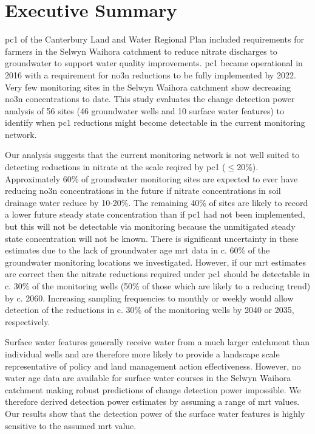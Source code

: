
\section*{Executive Summary} \label{exsum} %


\gls{pc1} of the Canterbury Land and Water Regional Plan included requirements for farmers in the Selwyn Waihora catchment to reduce nitrate discharges to groundwater to support water quality improvements.
\gls{pc1} became operational in 2016 with a requirement for \gls{no3n} reductions to be fully implemented by 2022.
Very few monitoring sites in the Selwyn Waihora catchment show decreasing \gls{no3n} concentrations to date.
This study evaluates the change detection power analysis of 56 sites (46 groundwater wells and 10 surface water features) to identify when \gls{pc1} reductions might become detectable in the current monitoring network.

Our analysis suggests that the current monitoring network is not well suited to detecting reductions in nitrate at the scale reqired by \gls{pc1} ($\leq$20\%).
Approximately 60\% of groundwater monitoring sites are expected to ever have reducing \gls{no3n} concentrations in the future if nitrate concentrations in soil drainage water reduce by 10-20\%.
The remaining 40\% of sites are likely to record a lower future steady state concentration than if \gls{pc1} had not been implemented, but this will not be detectable via monitoring because the unmitigated steady state concentration will not be known.
There is significant uncertainty in these estimates due to the lack of groundwater age \gls{mrt} data in c. 60\% of the groundwater monitoring locations we investigated.
However, if our \gls{mrt} estimates are correct then the nitrate reductions required under \gls{pc1} should be detectable in c. 30\% of the monitoring wells (50\% of those which are likely to a reducing trend) by c. 2060.
Increasing sampling frequencies to monthly or weekly would allow detection of the reductions in c. 30\% of the monitoring wells by 2040 or 2035, respectively.

Surface water features generally receive water from a much larger catchment than individual wells and are therefore more likely to provide a landscape scale representative of policy and land management action effectiveness. However, no water age data are available for surface water courses in the Selwyn Waihora catchment making robust predictions of change detection power impossible.
We therefore derived detection power estimates by assuming a range of \gls{mrt} values.
Our results show that the detection power of the surface water features is highly sensitive to the assumed \gls{mrt} value.

